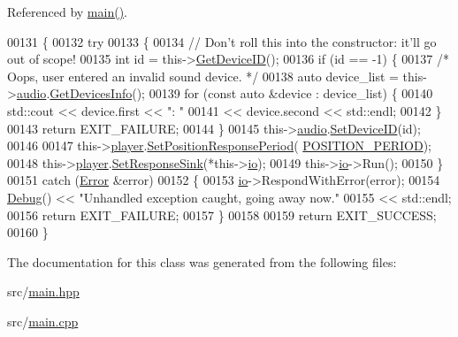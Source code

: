 Referenced by \hyperlink{main_8cpp_source_l00028}{main()}.


\begin{DoxyCode}
00131 \{
00132     \textcolor{keywordflow}{try}
00133     \{
00134         \textcolor{comment}{// Don't roll this into the constructor: it'll go out of scope!}
00135         \textcolor{keywordtype}{int} \textcolor{keywordtype}{id} = this->\hyperlink{classplayd_a767d029a5d1321e912c1a2a92e8f3c64}{GetDeviceID}();
00136         \textcolor{keywordflow}{if} (\textcolor{keywordtype}{id} == -1) \{
00137             \textcolor{comment}{/* Oops, user entered an invalid sound device. */}
00138             \textcolor{keyword}{auto} device\_list = this->\hyperlink{classplayd_a2c7193680bd18f1e9b3f63f2234485de}{audio}.\hyperlink{classAudioSystem_aa268faeb9243c18588631024958856e6}{GetDevicesInfo}();
00139             \textcolor{keywordflow}{for} (\textcolor{keyword}{const} \textcolor{keyword}{auto} &device : device\_list) \{
00140                 std::cout << device.first << \textcolor{stringliteral}{": "}
00141                           << device.second << std::endl;
00142             \}
00143             \textcolor{keywordflow}{return} EXIT\_FAILURE;
00144         \}
00145         this->\hyperlink{classplayd_a2c7193680bd18f1e9b3f63f2234485de}{audio}.\hyperlink{classAudioSystem_ade3b400828991d02e36a0b61302d30d2}{SetDeviceID}(\textcolor{keywordtype}{id});
00146 
00147         this->\hyperlink{classplayd_a8712fc23f3139a2fd2e9dbfb24b998dd}{player}.\hyperlink{classPlayer_a1e65e04dae199230d80639112ac07288}{SetPositionResponsePeriod}(
      \hyperlink{classplayd_a540bcb2dac9488bcb8e593378005bd07}{POSITION\_PERIOD});
00148         this->\hyperlink{classplayd_a8712fc23f3139a2fd2e9dbfb24b998dd}{player}.\hyperlink{classPlayer_a719de5af4d1534c2d805a19d5d995deb}{SetResponseSink}(*this->\hyperlink{classplayd_a066cb450455e1359e4f80cfa5ecb5c05}{io});
00149         this->\hyperlink{classplayd_a066cb450455e1359e4f80cfa5ecb5c05}{io}->Run();
00150     \}
00151     \textcolor{keywordflow}{catch} (\hyperlink{classError}{Error} &error)
00152     \{
00153         \hyperlink{classplayd_a066cb450455e1359e4f80cfa5ecb5c05}{io}->RespondWithError(error);
00154         \hyperlink{classDebug}{Debug}() << \textcolor{stringliteral}{"Unhandled exception caught, going away now."}
00155                 << std::endl;
00156         \textcolor{keywordflow}{return} EXIT\_FAILURE;
00157     \}
00158 
00159     \textcolor{keywordflow}{return} EXIT\_SUCCESS;
00160 \}
\end{DoxyCode}


The documentation for this class was generated from the following files\+:\begin{DoxyCompactItemize}
\item 
src/\hyperlink{main_8hpp}{main.\+hpp}\item 
src/\hyperlink{main_8cpp}{main.\+cpp}\end{DoxyCompactItemize}
